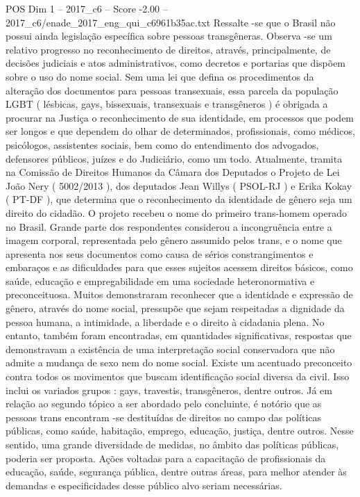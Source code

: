 \begin{textsample}{POS Dim 1 – 2017\_c6 – Score -2.00 – 2017\_c6/enade\_2017\_eng\_qui\_c6961b35ac.txt}
Ressalte -se que o Brasil não possui ainda legislação específica sobre pessoas transgêneras.
Observa -se um relativo progresso no reconhecimento de direitos, através, principalmente, de decisões judiciais e atos administrativos, como decretos e portarias que dispõem sobre o uso do nome social.
Sem uma lei que defina os procedimentos da alteração dos documentos para pessoas transexuais, essa parcela da população LGBT ( lésbicas, gays, bissexuais, transexuais e transgêneros ) é obrigada a procurar na Justiça o reconhecimento de sua identidade, em processos que podem ser longos e que dependem do olhar de determinados, profissionais, como médicos, psicólogos, assistentes sociais, bem como do entendimento dos advogados, defensores públicos, juízes e do Judiciário, como um todo.
Atualmente, tramita na Comissão de Direitos Humanos da Câmara dos Deputados o Projeto de Lei João Nery ( 5002/2013 ), dos deputados Jean Willys ( PSOL-RJ ) e Erika Kokay ( PT-DF ), que determina que o reconhecimento da identidade de gênero seja um direito do cidadão.
O projeto recebeu o nome do primeiro trans-homem operado no Brasil.
Grande parte dos respondentes considerou a incongruência entre a imagem corporal, representada pelo gênero assumido pelos trans, e o nome que apresenta nos seus documentos como causa de sérios constrangimentos e embaraços e as dificuldades para que esses sujeitos acessem direitos básicos, como saúde, educação e empregabilidade em uma sociedade heteronormativa e preconceituosa.
Muitos demonstraram reconhecer que a identidade e expressão de gênero, através do nome social, pressupõe que sejam respeitadas a dignidade da pessoa humana, a intimidade, a liberdade e o direito à cidadania plena.
No entanto, também foram encontradas, em quantidades significativas, respostas que demonstravam a existência de uma interpretação social conservadora que não admite a mudança de sexo nem do nome social.
Existe um acentuado preconceito contra todos os movimentos que buscam identificação social diversa da civil.
Isso inclui os variados grupos : gays, travestis, transgêneros, dentre outros.
Já em relação ao segundo tópico a ser abordado pelo concluinte, é notório que as pessoas trans encontram -se destituídas de direitos no campo das políticas públicas, como saúde, habitação, emprego, educação, justiça, dentre outros.
Nesse sentido, uma grande diversidade de medidas, no âmbito das políticas públicas, poderia ser proposta.
Ações voltadas para a capacitação de profissionais da educação, saúde, segurança pública, dentre outras áreas, para melhor atender às demandas e especificidades desse público alvo seriam necessárias.

\end{textsample}
